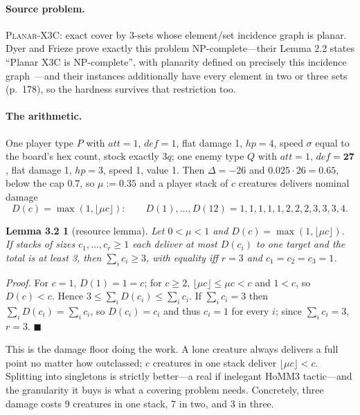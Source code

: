 \documentclass[11pt,a4paper]{article}
\theoremstyle{plain}
\newtheorem*{lemresource}{Lemma 3.2}
\theoremstyle{definition}
\theoremstyle{plain}
\theoremstyle{definition}
\theoremstyle{remark}
\newcommand{\PX}{\textsc{Planar-X3C}}
\newcommand{\qedbox}{\hfill$\blacksquare$}
\begin{document}
\paragraph{Source problem.} \PX: exact cover by 3-sets whose element/set incidence graph is
planar. Dyer and Frieze prove exactly this problem NP-complete---their Lemma 2.2 states
``Planar X3C is NP-complete'', with planarity defined on precisely this incidence
graph~\cite[p.~175]{DF86}---and their instances additionally have every element in two or
three sets (p.~178), so the hardness survives that restriction too.

\paragraph{The arithmetic.} One player type $P$ with $\mathit{att}=1$, $\mathit{def}=1$, flat
damage 1, $\mathit{hp}=4$, speed $\sigma$ equal to the board's hex count, stock exactly $3q$;
one enemy type $Q$ with $\mathit{att}=1$, $\mathit{def}=\mathbf{27}$, flat damage 1,
$\mathit{hp}=3$,
speed 1, value 1. Then $\Delta=-26$ and $0.025\cdot 26=0.65$, below the cap $0.7$, so
$\mu:=0.35$ and a player stack of $c$ creatures delivers nominal damage
\[
  D(c)=\max(1,\lfloor\mu c\rfloor):\qquad
  D(1),\dots,D(12)=1,1,1,1,1,2,2,2,3,3,3,4.
\]

\begin{lemresource}[resource lemma]
Let $0<\mu<1$ and $D(c)=\max(1,\lfloor\mu c\rfloor)$. If stacks of sizes
$c_1,\dots,c_r\ge 1$ each deliver at most $D(c_i)$ to one target and the total is at least 3,
then $\sum_i c_i\ge 3$, with equality iff $r=3$ and $c_1=c_2=c_3=1$.
\end{lemresource}

\noindent\emph{Proof.} For $c=1$, $D(1)=1=c$; for $c\ge 2$, $\lfloor\mu c\rfloor\le\mu c<c$
and $1<c$, so $D(c)<c$. Hence $3\le\sum_i D(c_i)\le\sum_i c_i$. If $\sum_i c_i=3$ then
$\sum_i D(c_i)=\sum_i c_i$, so $D(c_i)=c_i$ and thus $c_i=1$ for every $i$; since
$\sum_i c_i=3$, $r=3$. \qedbox

\smallskip
This is the damage floor doing the work. A lone creature always delivers a full point no matter
how outclassed; $c$ creatures in one stack deliver $\lfloor\mu c\rfloor<c$. Splitting into
singletons is strictly better---a real if inelegant HoMM3 tactic---and the granularity it buys
is what a covering problem needs. Concretely, three damage costs 9 creatures in one stack, 7 in
two, and 3 in three.
\end{document}
